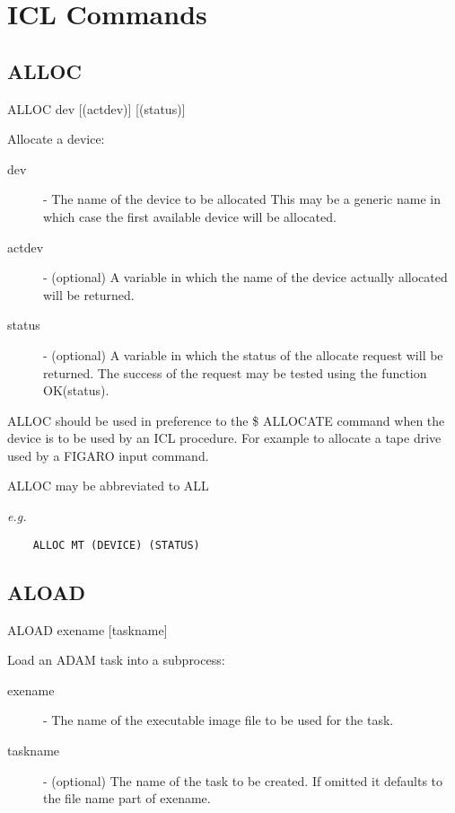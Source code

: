 \chapter{ICL Commands}

\section{ALLOC}



    ALLOC \hspace{.5cm} dev \hspace{.5cm} [(actdev)] \hspace{.5cm} [(status)]

    Allocate a device:
\begin{description}

\item[dev] - The name of the device to be allocated
            This may be a generic name in which case the first
            available device will be allocated.

\item[actdev] - (optional) A variable in which the name of the
            device actually allocated will be returned.

\item[status] - (optional) A variable in which the status of
            the allocate request will be returned. The success of
            the request may be tested using the function OK(status).

\end{description}

  ALLOC should be used in preference to the \$ ALLOCATE command when
  the device is to be used by an ICL procedure. For example to allocate
  a tape drive used by a FIGARO input command.

  ALLOC may be abbreviated to ALL

{\em e.g. }
\begin{verbatim}
    ALLOC MT (DEVICE) (STATUS) 
\end{verbatim}   

\section{ALOAD}

 
    ALOAD \hspace{.5cm} exename \hspace{.5cm} [taskname]

    Load an ADAM task into a subprocess:
\begin{description}

\item[exename] - The name of the executable image file to
            be used for the task.

\item[taskname] - (optional) The name of the task to be created.
            If omitted it defaults to the file name part of
            exename.

\end{description}

